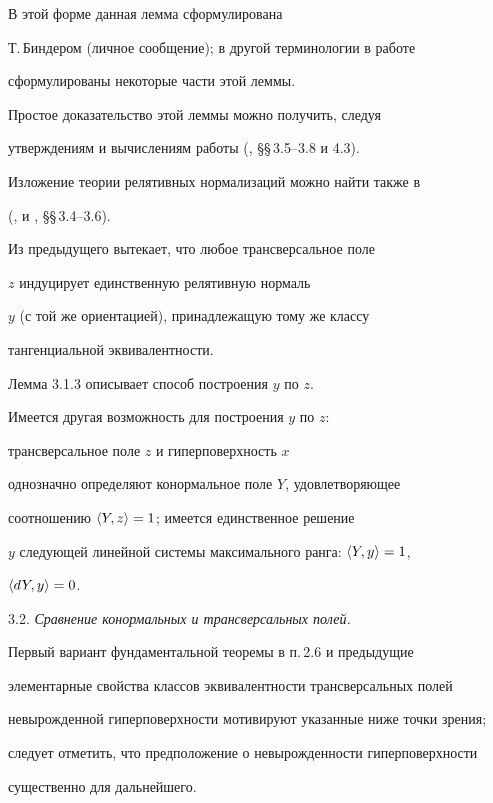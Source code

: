 В этой форме данная лемма сформулирована


Т.\,Биндером (личное сообщение); в другой терминологии в работе


\cite{TAB} сформулированы некоторые части этой леммы.


Простое доказательство этой леммы можно получить, следуя


утверждениям и вычислениям работы (\cite{SIM-S-V}, \S\S\,3.5--3.8 и 4.3).


Изложение теории релятивных нормализаций можно найти также в


(\cite{SCHI}, \cite{NOM-SA} и \cite{SIM-S-V}, \S\S\,3.4--3.6).





Из предыдущего вытекает, что любое трансверсальное поле


$z$ индуцирует единственную релятивную нормаль


$y$ (с той же ориентацией), принадлежащую тому же классу


тангенциальной эквивалентности.


Лемма 3.1.3 описывает способ построения $y$ по $z$.


Имеется другая возможность для построения $y$ по $z$:


трансверсальное поле $z$ и гиперповерхность $x$


однозначно определяют конормальное поле $Y$, удовлетворяющее


соотношению $\langle Y,z\rangle =1$; имеется единственное решение


$y$ следующей линейной системы максимального ранга: $\langle Y,y\rangle =1$,


$\langle dY,y\rangle =0$.


\medskip





3.2. {\it Сравнение конормальных и трансверсальных полей.}


Первый вариант фундаментальной теоремы в п.\,2.6 и предыдущие


элементарные свойства классов эквивалентности трансверсальных полей


невырожденной гиперповерхности мотивируют указанные ниже точки зрения;


следует отметить, что предположение о невырожденности гиперповерхности


существенно для дальнейшего.


\smallskip





